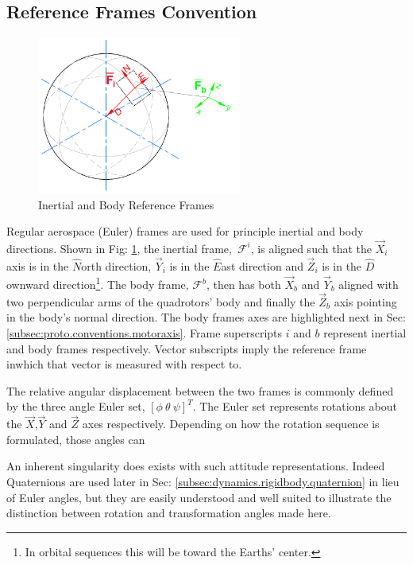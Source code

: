 \subsection{Reference Frames Convention}
\label{subsec:proto.conventions.frames}
\begin{figure}[htbp]
\centering
\includegraphics[width=0.6\textwidth]{figs/reference_frame}
\caption{Inertial and Body Reference Frames}
\label{fig:ref_frame}
\end{figure}
Regular aerospace (Euler) frames are used for principle inertial and body directions. Shown in Fig: \ref{fig:ref_frame}, the inertial frame,~$\mathcal{F}^i$, is aligned such that the $\vec{X}_i$ axis is in the $\hat{N}$orth direction, $\vec{Y}_i$ is in the $\hat{E}$ast direction and $\vec{Z}_i$ is  in the $\hat{D}$ownward direction\footnote{In orbital sequences this will be toward the Earths' center.}. The body frame, $\mathcal{F}^b$, then has both $\vec{X}_b$ and $\vec{Y}_b$ aligned with two perpendicular arms of the quadrotors' body and finally the $\vec{Z}_b$ axis pointing in the body's normal direction. The body frames axes are highlighted next in Sec:\ref{subsec:proto.conventions.motoraxis}. Frame superscripts $i$ and $b$ represent inertial and body frames respectively. Vector subscripts imply the reference frame inwhich that vector is measured with respect to. 
\par
The relative angular displacement between the two frames is commonly defined by the three angle Euler set, $[\phi ~\theta ~\psi]^T$. The Euler set represents rotations about the $\vec{X}$,$\vec{Y}$ and $\vec{Z}$ axes respectively. Depending on how the rotation sequence is formulated, those angles can 
\par
An inherent singularity does exists with such attitude representations. Indeed Quaternions are used later in Sec: \ref{subsec:dynamics.rigidbody.quaternion} in lieu of Euler angles, but they are easily understood and well suited to illustrate the distinction between rotation and transformation angles made here.
\par

